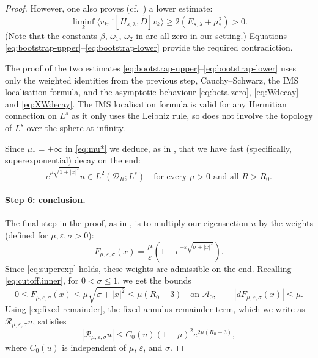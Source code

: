 \documentclass{article}
\theoremstyle{definition}
\numberwithin{thm}{section}
\numberwithin{equation}{section}
\newcommand{\ii}{\mathrm i}
\newcommand{\ip}[2]{\langle #1,#2\rangle}
\begin{document}
\begin{proof}
However, one also proves (cf.~\cite[(4.17)]{AHK}) a lower estimate: 
\begin{equation}\label{eq:bootstrap-lower}
        \liminf_k \ip{v_k}{\ii[H_{s,\lambda},\widetilde D]v_k}
        \geq 2(E_{s,\lambda}+\mu_*^2)>0.
\end{equation}
(Note that the constants $\beta$, $\omega_1$, $\omega_2$ in \cite[(4.17)]{AHK} are all zero in our setting.) Equations \eqref{eq:bootstrap-upper}--\eqref{eq:bootstrap-lower} provide the required contradiction.  

The proof of the two estimates \eqref{eq:bootstrap-upper}--\eqref{eq:bootstrap-lower} uses only the weighted identities from the previous step, Cauchy--Schwarz, the IMS localisation formula, and  the asymptotic behaviour \eqref{eq:beta-zero}, \eqref{eq:Wdecay} and \eqref{eq:XWdecay}.  The IMS localisation formula is valid for any Hermitian connection on $L^s$ as it only uses the Leibniz rule, so does not involve the topology of $L^s$ over the sphere at infinity.  
 

Since $\mu_*=+\infty$ in \eqref{eq:mu*}  we deduce, as in \cite{AHK}, that we have fast (specifically, superexponential) decay on the end:
\begin{equation}\label{eq:superexp}
        e^{\mu \sqrt{1+|x|^2}}u\in L^2(\mathcal{D}_{R};L^s)
        \quad\text{for every }\mu>0\text{ and all }R>R_0.
\end{equation}

\paragraph {\bf Step 6: conclusion.}
The final step in the proof, as in \cite[Theorem 4.8]{AHK}, is to multiply our eigensection $u$ by the weights (defined for $\mu,\varepsilon,\sigma>0$):
\begin{equation}\label{eq:F.mu.eps.sig}
        F_{\mu,\varepsilon,\sigma}(x)=\frac{\mu}{\varepsilon}
        \left(1-e^{-\varepsilon\sqrt{\sigma+|x|^2}}\right).
\end{equation}
Since \eqref{eq:superexp} holds, these
weights are admissible on the end. Recalling \eqref{eq:cutoff.inner},  for \(0<\sigma\leq1\), we get the bounds
\begin{equation}
0\leq F_{\mu,\varepsilon,\sigma}(x) \leq \mu\sqrt{\sigma+|x|^2}\leq\mu (R_0+3)
\quad\text{on }\mathcal{A}_0,
\qquad
|dF_{\mu,\varepsilon,\sigma}(x)|
\leq
\mu.
\end{equation} Using \eqref{eq:fixed-remainder},
the fixed-annulus remainder term, which we write as $\mathcal{R}_{\mu,\varepsilon,\sigma}u$, satisfies
\begin{equation}\label{eq:fixed.annulus.final}
|\mathcal R_{\mu,\varepsilon,\sigma}u| \leq C_0(u)(1+\mu)^2e^{2\mu (R_0+3)},
\end{equation}
where $C_0(u)$ is independent of $\mu$, $\varepsilon$, and $\sigma$.


\end{proof}
\end{document}
